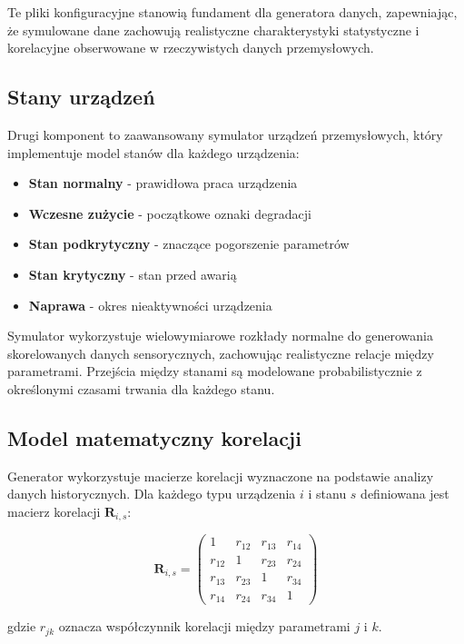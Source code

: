 Te pliki konfiguracyjne stanowią fundament dla generatora danych, zapewniając, że symulowane dane zachowują realistyczne charakterystyki statystyczne i korelacyjne obserwowane w rzeczywistych danych przemysłowych.

\subsection{Stany urządzeń}
\label{subsec:symulator_urzadzen}

Drugi komponent to zaawansowany symulator urządzeń przemysłowych, który implementuje model stanów dla każdego urządzenia:

\begin{itemize}
    \item \textbf{Stan normalny} - prawidłowa praca urządzenia
    \item \textbf{Wczesne zużycie} - początkowe oznaki degradacji
    \item \textbf{Stan podkrytyczny} - znaczące pogorszenie parametrów
    \item \textbf{Stan krytyczny} - stan przed awarią
    \item \textbf{Naprawa} - okres nieaktywności urządzenia
\end{itemize}

Symulator wykorzystuje wielowymiarowe rozkłady normalne do generowania skorelowanych danych sensorycznych, zachowując realistyczne relacje między parametrami. Przejścia między stanami są modelowane probabilistycznie z określonymi czasami trwania dla każdego stanu.


\subsection{Model matematyczny korelacji}
\label{subsec:model_korelacji}

Generator wykorzystuje macierze korelacji wyznaczone na podstawie analizy danych historycznych. Dla każdego typu urządzenia $i$ i stanu $s$ definiowana jest macierz korelacji $\mathbf{R}_{i,s}$:

$$\mathbf{R}_{i,s} = \begin{pmatrix}
1 & r_{12} & r_{13} & r_{14} \\
r_{12} & 1 & r_{23} & r_{24} \\
r_{13} & r_{23} & 1 & r_{34} \\
r_{14} & r_{24} & r_{34} & 1
\end{pmatrix}$$

gdzie $r_{jk}$ oznacza współczynnik korelacji między parametrami $j$ i $k$.


